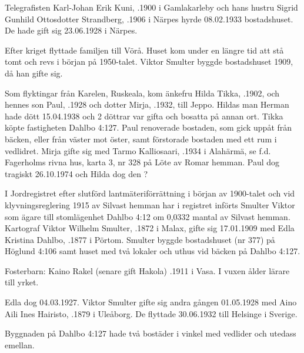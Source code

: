 Telegrafisten Karl-Johan Erik Kuni, .1900 i Gamlakarleby och hans hustru Sigrid Gunhild Ottosdotter Strandberg, .1906 i Närpes hyrde 08.02.1933 bostadshuset. De hade gift sig 23.06.1928 i Närpes.
\begin{jhchildren}
  \item {}
  \item {}
\end{jhchildren}
Efter kriget flyttade familjen till Vörå. Huset kom under en längre tid	att stå tomt och revs i början på 1950-talet. Viktor Smulter byggde	bostadshuset 1909, då han gifte sig.


Som flyktingar från Karelen, Ruskeala, kom änkefru Hilda Tikka, .1902, och hennes son Paul, .1928 och dotter Mirja,	.1932, till Jeppo. Hildas man Herman hade dött 15.04.1938 och 2 döttrar var gifta och bosatta på annan ort. Tikka köpte fastigheten Dahlbo 4:127. Paul renoverade bostaden, som gick uppåt från bäcken,	eller från väster mot öster, samt förstorade bostaden med ett rum i vedlidret. Mirja gifte sig med Tarmo Kalliosaari, .1934 i Alahärmä, se f.d. Fagerholms rivna hus, karta 3, nr 328 på Löte av Romar hemman. Paul dog tragiskt 26.10.1974 och Hilda dog den ?


I Jordregistret efter slutförd lantmäteriförrättning i början av 1900-talet	och vid klyvningsreglering 1915 av Silvast hemman har i registret införts	Smulter Viktor som ägare till stomlägenhet Dahlbo 4:12 om 0,0332 mantal av Silvast hemman. Kartograf Viktor Wilhelm Smulter, .1872 i Malax, gifte sig 17.01.1909 med Edla Kristina Dahlbo, .1877 i 	Pörtom. Smulter byggde bostadshuset (nr 377) på Höglund 4:106 samt huset med två lokaler och uthus vid bäcken på Dahlbo 4:127.

Fosterbarn: Kaino Rakel (senare gift Hakola) .1911 i Vasa. I vuxen ålder lärare till yrket.

Edla dog 04.03.1927. Viktor Smulter gifte sig andra gången 01.05.1928 med Aino Aili Ines Hairisto, .1879 i Uleåborg. De flyttade 30.06.1932 till Helsinge i Sverige.


Byggnaden på Dahlbo 4:127 hade två bostäder i vinkel med vedlider och	utedass emellan.

